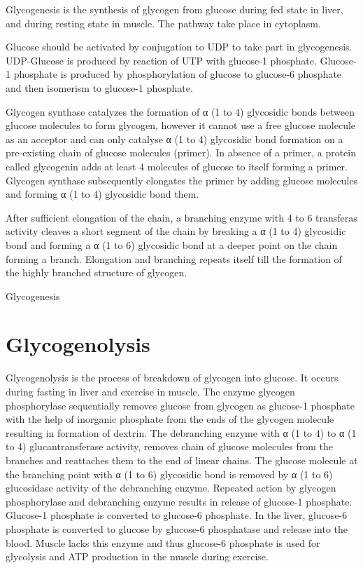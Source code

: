 \documentclass[
]{book}
\begin{document}
Glycogenesis is the synthesis of glycogen from glucose during fed state in liver, and during resting state in muscle. The pathway take place in cytoplasm.

Glucose should be activated by conjugation to UDP to take part in glycogenesis. UDP-Glucose is produced by reaction of UTP with glucose-1 phosphate. Glucose-1 phosphate is produced by phosphorylation of glucose to glucose-6 phosphate and then isomerism to glucose-1 phosphate.

Glycogen synthase catalyzes the formation of α (1 to 4) glycosidic bonds between glucose molecules to form glycogen, however it cannot use a free glucose molecule as an acceptor and can only catalyse α (1 to 4) glycosidic bond formation on a pre-existing chain of glucose molecules (primer). In absence of a primer, a protein called glycogenin adds at least 4 molecules of glucose to itself forming a primer. Glycogen synthase subsequently elongates the primer by adding glucose molecules and forming α (1 to 4) glycosidic bond them.

After sufficient elongation of the chain, a branching enzyme with 4 to 6 transferas activity cleaves a short segment of the chain by breaking a α (1 to 4) glycosidic bond and forming a α (1 to 6) glycosidic bond at a deeper point on the chain forming a branch. Elongation and branching repeats itself till the formation of the highly branched structure of glycogen.

Glycogenesis

\section{Glycogenolysis}\label{glycogenolysis}

Glycogenolysis is the process of breakdown of glycogen into glucose. It occurs during fasting in liver and exercise in muscle. The enzyme glycogen phosphorylase sequentially removes glucose from glycogen as glucose-1 phosphate with the help of inorganic phosphate from the ends of the glycogen molecule resulting in formation of dextrin. The debranching enzyme with α (1 to 4) to α (1 to 4) glucantransferase activity, removes chain of glucose molecules from the branches and reattaches them to the end of linear chains. The glucose molecule at the branching point with α (1 to 6) glycosidic bond is removed by α (1 to 6) glucosidase activity of the debranching enzyme. Repeated action by glycogen phosphorylase and debranching enzyme results in release of glucose-1 phosphate. Glucose-1 phosphate is converted to glucose-6 phosphate. In the liver, glucose-6 phosphate is converted to glucose by glucose-6 phosphatase and release into the blood. Muscle lacks this enzyme and thus glucose-6 phosphate is used for glycolysis and ATP production in the muscle during exercise.
\end{document}
